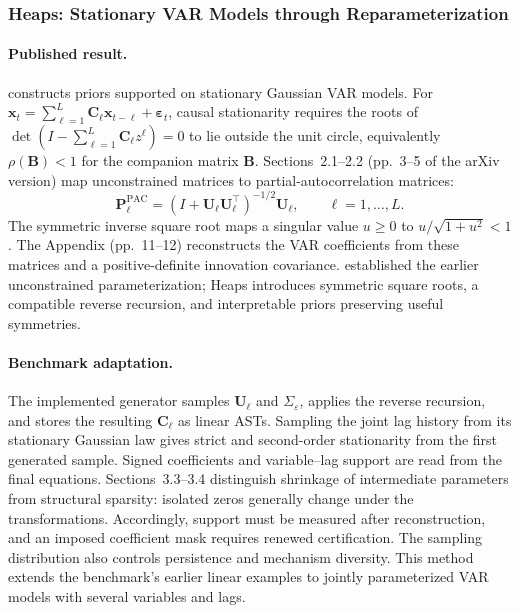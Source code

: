 \subsubsection{Heaps: Stationary VAR Models through Reparameterization}
\label{sec:heaps-var}

\paragraph{Published result.}
\citet{heaps2023stationarity} constructs priors supported on stationary Gaussian
VAR models. For $\mathbf{x}_t=\sum_{\ell=1}^{L}\mathbf C_\ell
\mathbf{x}_{t-\ell}+\boldsymbol\varepsilon_t$, causal stationarity requires
the roots of \mbox{$\det(I-\sum_{\ell=1}^{L}\mathbf C_\ell z^\ell)=0$} to lie
outside the unit circle, equivalently $\rho(\mathbf B)<1$ for the companion
matrix $\mathbf B$. Sections~2.1--2.2 (pp.~3--5 of the arXiv version) map
unconstrained matrices to partial-autocorrelation matrices:
\begin{equation}
 \mathbf P_\ell^{\mathrm{PAC}}
 =\left(I+\mathbf U_\ell\mathbf U_\ell^\top\right)^{-1/2}\mathbf U_\ell,
 \qquad \ell=1,\ldots,L.
\label{eq:heaps-pac-map}
\end{equation}
The symmetric inverse square root maps a singular value $u\geq0$ to
$u/\sqrt{1+u^2}<1$. The Appendix (pp.~11--12) reconstructs the VAR coefficients
from these matrices and a positive-definite innovation covariance.
\citet{ansley1986reparameterizing} established the earlier unconstrained
parameterization; Heaps introduces symmetric square roots, a compatible
reverse recursion, and interpretable priors preserving useful symmetries.

\paragraph{Benchmark adaptation.}
The implemented generator samples $\mathbf U_\ell$ and $\Sigma_{\varepsilon}$,
applies the reverse recursion, and stores the resulting $\mathbf C_\ell$
as linear ASTs.
Sampling the joint lag history from its stationary Gaussian law gives strict
and second-order stationarity from the first generated sample. Signed
coefficients and variable--lag support are read from the final equations.
Sections~3.3--3.4 distinguish shrinkage of intermediate parameters from
structural sparsity: isolated zeros generally change under the transformations.
Accordingly, support must be measured after reconstruction, and an imposed
coefficient mask requires renewed certification. The sampling distribution
also controls persistence and mechanism diversity. This method extends the
benchmark's earlier linear examples to jointly parameterized VAR models
with several variables and lags.
